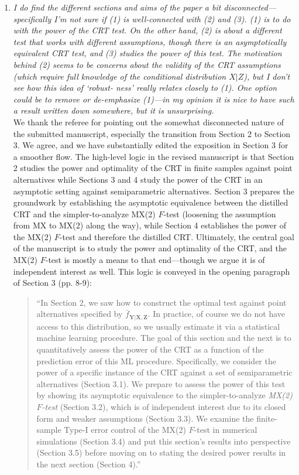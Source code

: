 \documentclass[12pt]{article}
\begin{document}
\begin{enumerate}
	\item \textsl{I do find the different sections and aims of the paper a bit disconnected— specifically I’m not sure if (1) is well-connected with (2) and (3). (1) is to do with the power of the CRT test. On the other hand, (2) is about a different test that works with different assumptions, though there is an asymptotically equivalent CRT test, and (3) studies the power of this test. The motivation behind (2) seems to be concerns about the validity of the CRT assumptions (which require full knowledge of the conditional distribution $X|Z$), but I don’t see how this idea of ‘robust- ness’ really relates closely to (1). One option could be to remove or de-emphasize (1)—in my opinion it is nice to have such a result written down somewhere, but it is unsurprising.}\\
	
	We thank the referee for pointing out the somewhat disconnected nature of the submitted manuscript, especially the transition from Section 2 to Section 3. We agree, and we have substantially edited the exposition in Section 3 for a smoother flow. The high-level logic in the revised manuscript is that Section 2 studies the power and optimality of the CRT in finite samples against point alternatives while Sections 3 and 4 study the power of the CRT in an asymptotic setting against semiparametric alternatives. Section 3 prepares the groundwork by establishing the asymptotic equivalence between the distilled CRT and the simpler-to-analyze MX(2) $F$-test (loosening the assumption from MX to MX(2) along the way), while Section 4 establishes the power of the MX(2) $F$-test and therefore the distilled CRT. Ultimately, the central goal of the manuscript is to study the power and optimality of the CRT, and the MX(2) $F$-test is mostly a means to that end---though we argue it is of independent interest as well. This logic is conveyed in the opening paragraph of Section 3 (pp. 8-9):
	
	\begin{quote}
		``In Section 2, we saw how to construct the optimal test against point alternatives specified by $\bar f_{\bm Y| \bm X, \bm Z}$. In practice, of course we do not have access to this distribution, so we usually estimate it via a statistical machine learning procedure. The goal of this section and the next is to quantitatively assess the power of the CRT as a function of the prediction error of this ML procedure. Specifically, we consider  the power of a specific instance of the CRT against a set of semiparametric alternatives (Section 3.1). We prepare to assess the power of this test by showing its asymptotic equivalence to the simpler-to-analyze \textit{MX(2) $F$-test} (Section 3.2), which is of independent interest due to its closed form and weaker assumptions (Section 3.3). We examine the finite-sample Type-I error control of the MX(2) $F$-test in numerical simulations (Section 3.4) and put this section's results into perspective (Section 3.5) before moving on to stating the desired power results in the next section (Section 4).''
	\end{quote}
	 	

\end{enumerate}
\end{document}

